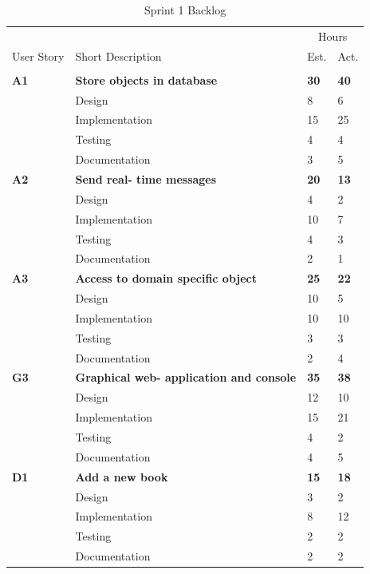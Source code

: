\begin{table}
\caption{Sprint 1 Backlog}
\centering
\begin{tabular}{ l p{8cm} l l }
\hline 
			&				&\multicolumn{2}{c}{Hours}			\\
 User Story	& Short Description		&Est.		&Act.	                               \\ 
\hline \\ [-2.0ex]
 \bf{A1}     &\bf{Store objects in database}		&\bf{30}		&\bf{40}          \\ 
		  &Design							&8			&6		\\
		  &Implementation					&15			&25		\\
		  &Testing						&4			&4		\\
		  &Documentation					&3			&5		\\

 \bf{A2}     &\bf{Send real- time messages} 		&\bf{20}		&\bf{13}               \\ 
		  &Design							&4			&2		\\
		  &Implementation					&10			&7		\\
		  &Testing						&4			&3		\\
		  &Documentation					&2			&1		\\

 \bf{A3}     &\bf{Access to domain specific object} 	&\bf{25}		&\bf{22}		     \\ 
		  &Design							&10			&5		\\
		  &Implementation					&10			&10		\\
		  &Testing						&3			&3		\\
		  &Documentation					&2			&4		\\

 \bf{G3}     &\bf{Graphical web- application and console}		&\bf{35}		&\bf{38}		     \\ 
		  &Design							&12			&10		\\
		  &Implementation					&15			&21		\\
		  &Testing						&4			&2		\\
		  &Documentation					&4			&5		\\

 \bf{D1}	  &\bf{Add a new book}				&\bf{15}		&\bf{18}		     \\
		  &Design							&3			&2		\\
		  &Implementation					&8			&12		\\
		  &Testing						&2			&2		\\
		  &Documentation					&2			&2		\\


\end{tabular}
\end{table}
